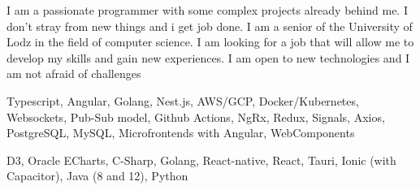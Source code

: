 \documentclass[9pt]{developercv}%
\begin{document}
\begin{minipage}[t]{0.45\textwidth} %
	\vspace{-\baselineskip}
	
	I am a passionate programmer with some complex projects already behind me. I don't stray from new things and i get job done. I am a senior of the University of Lodz in the field of computer science. I am looking for a job that will allow me to develop my skills and gain new experiences. I am open to new technologies and I am not afraid of challenges
\end{minipage}
\hfill
\begin{minipage}[t]{0.45\textwidth}
	\vspace{-\baselineskip}
	\begin{barchart}{3}
	\end{barchart}
\end{minipage}
\vspace{1.0cm}

\begin{minipage}[t]{0.45\textwidth}
	\vspace{-\baselineskip}

	Typescript, Angular, Golang, Nest.js, AWS/GCP, Docker/Kubernetes,
	Websockets, Pub-Sub model, Github Actions, NgRx, Redux, Signals, Axios, 
	PostgreSQL, MySQL, Microfrontends with Angular, WebComponents
\end{minipage}
\hfill
\begin{minipage}[t]{0.45\textwidth}
	\vspace{-\baselineskip}

	D3, Oracle ECharts, C-Sharp, Golang, React-native, React, Tauri, Ionic (with Capacitor), Java (8 and 12), Python
\end{minipage}
\vspace{1.0cm}

\end{document}
